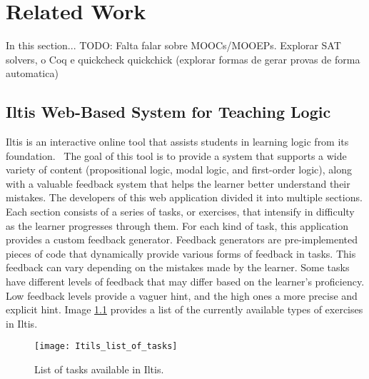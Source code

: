 
%

\chapter{Related Work}

In this section...
TODO: Falta falar sobre MOOCs/MOOEPs. Explorar SAT solvers, o Coq e quickcheck quickchick (explorar formas de gerar provas de forma automatica)

\section{Iltis Web-Based System for Teaching Logic}
\label{chap:iltis}

Iltis is an interactive online tool that assists students in learning logic from its foundation.~\cite{geck_iltis, geck_2018_introduction} The goal of this tool is to provide a system that supports a wide variety of content (propositional logic, modal logic, and first-order logic), along with a valuable feedback system that helps the learner better understand their mistakes. The developers of this web application divided it into multiple sections. Each section consists of a series of tasks, or exercises, that intensify in difficulty as the learner progresses through them. For each kind of task, this application provides a custom feedback generator. Feedback generators are pre-implemented pieces of code that dynamically provide various forms of feedback in tasks. This feedback can vary depending on the mistakes made by the learner. Some tasks have different levels of feedback that may differ based on the learner’s proficiency. Low feedback levels provide a vaguer hint, and the high ones a more precise and explicit hint. Image \ref{img:iltis_tasks} provides a list of the currently available types of exercises in Iltis.

\begin{figure}[htbp]
    \centering
    \texttt{[image: Itils\_list\_of\_tasks]}
    \caption{List of tasks available in Iltis.}
    \label{img:iltis_tasks}
\end{figure}

